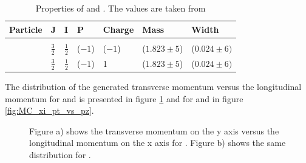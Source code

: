\begin{table}[bp]
	\centering
	\caption{Properties of \excitedcascade and \excitedanticascade. The values are taken from \cite{PDG}}
	\label{tab:eventgeneration_Xivalues}
	\begin{tabular}{lllllll}
		\hline
		Particle & J & I & P & Charge & Mass  & Width \\
		\hline
		\hline
		&&&&&&\\
		\excitedcascade & $\frac{3}{2}$ & $\frac{1}{2}$ & ($-1$) & ($-1$) & ($1.823 \pm 5$) \massunit & ($0.024 \pm 6) $ \massunit \\
		\excitedanticascade & $\frac{3}{2}$ & $\frac{1}{2}$ & ($-1$) & 1 & ($1.823 \pm 5$) \massunit & ($0.024 \pm 6) $ \massunit\\
		\hline
		  
	\end{tabular}
\end{table}

The distribution of the generated transverse momentum versus the longitudinal momentum for \lam and \alam is presented in figure \ref{fig:MC_lambda0_pt_vs_pz} and for \anticascade and \excitedcascade in figure \ref{fig:MC_xi_pt_vs_pz}.\\


\begin{figure}
	\caption{\propose Figure a) shows the transverse momentum on the y axis versus the longitudinal momentum on the x axis for \lam. Figure b) 
			shows the same distribution for \alam.}
	\label{fig:MC_lambda0_pt_vs_pz}
\end{figure}


